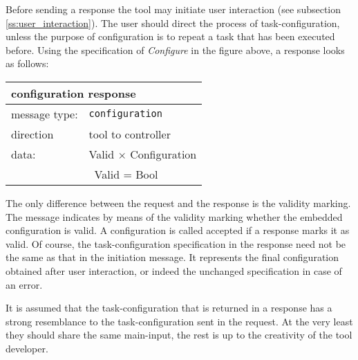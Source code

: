 \documentclass{article}
\newcommand{\msg}[1]{\texttt{#1}}
\begin{document}
   Before sending a response the tool may initiate user interaction (see
   subsection \ref{ss:user_interaction}). The user should direct the process of
   task-configuration, unless the purpose of configuration is to repeat a task
   that has been executed before. Using the specification of \textit{Configure}
   in the figure above, a response looks as follows:

   \begin{table}[H]
    \begin{center}
     \begin{tabular}{|ll|}
      \hline
       \multicolumn{2}{|l|}{\textbf{configuration response}} \\
      \hline
       message type:   & \msg{configuration} \\
      \hline
       direction       & tool to controller \\
       data:           & Valid $\times$ Configuration \\
                       & \ Valid = Bool \\
      \hline
     \end{tabular}
    \end{center}
    \vspace{-0.4cm}
   \end{table}

   \noindent The only difference between the request and the response is
   the validity marking. The message indicates by means of the validity marking
   whether the embedded configuration is valid. A configuration is called
   accepted if a response marks it as valid. Of course, the task-configuration
   specification in the response need not be the same as that in the initiation
   message. It represents the final configuration obtained after user
   interaction, or indeed the unchanged specification in case of an error.

   It is assumed that the task-configuration that is returned in a response has
   a strong resemblance to the task-configuration sent in the request. At the
   very least they should share the same main-input, the rest is up to the
   creativity of the tool developer.

  \pagebreak
\end{document}
